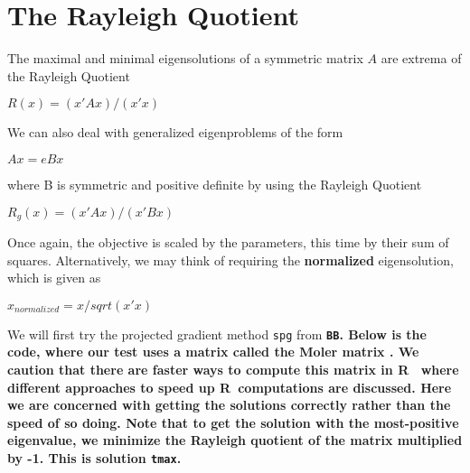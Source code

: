 \documentclass[11pt]{article}\usepackage[]{graphicx}\usepackage[]{color}
\newcommand{\B}[1]{{\bf #1 \rm}}
\newcommand{\R}{{\sf R}}
\newcommand{\code}[1]{{\tt#1}}
\newcommand{\pkg}[1]{\bf{\tt#1}\rm }
\begin{document}
\section{The Rayleigh Quotient}

The maximal and minimal eigensolutions of a symmetric matrix $A$ are extrema of the Rayleigh Quotient

$ R(x) =  (x' A x)  / (x' x) $

We can also deal with generalized eigenproblems of the form 

$A x = e B x$

where B is symmetric and positive definite by using the Rayleigh Quotient

$ R_g(x) =  (x' A x)  / (x' B x) $


Once again, the objective is scaled by the parameters, this time by their 
sum of squares. Alternatively, 
we may think of requiring the \B{normalized} eigensolution, which is given as 

$ x_{normalized} = x/sqrt(x' x) $

We will first try the projected gradient method \code{spg} from \pkg{BB}. 
Below is the code, where our test uses
a matrix called the Moler matrix \cite[Appendix 1]{cnm79}. We caution that there
are faster ways to compute this matrix in \R\ \citep{RQtimes12} where different
approaches to speed up \R\ computations are discussed. Here we are concerned 
with getting the solutions correctly rather than the speed of so doing. Note
that to get the solution with the most-positive eigenvalue, we minimize the
Rayleigh quotient of the matrix multiplied by -1. This is solution \code{tmax}.
\end{document}
